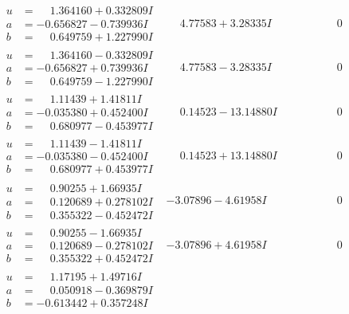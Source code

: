 \documentclass[1p]{elsarticle_modified}
\theoremstyle{definition}
\begin{document}
$$\begin{array}{c|c|c}
\begin{aligned}
u &= \phantom{-}1.364160 + 0.332809 I \\
a &= -0.656827 - 0.739936 I \\
b &= \phantom{-}0.649759 + 1.227990 I\end{aligned}
 & \phantom{-}4.77583 + 3.28335 I & \phantom{-0.000000 } 0 \\ \hline\begin{aligned}
u &= \phantom{-}1.364160 - 0.332809 I \\
a &= -0.656827 + 0.739936 I \\
b &= \phantom{-}0.649759 - 1.227990 I\end{aligned}
 & \phantom{-}4.77583 - 3.28335 I & \phantom{-0.000000 } 0 \\ \hline\begin{aligned}
u &= \phantom{-}1.11439 + 1.41811 I \\
a &= -0.035380 + 0.452400 I \\
b &= \phantom{-}0.680977 - 0.453977 I\end{aligned}
 & \phantom{-}0.14523 - 13.14880 I & \phantom{-0.000000 } 0 \\ \hline\begin{aligned}
u &= \phantom{-}1.11439 - 1.41811 I \\
a &= -0.035380 - 0.452400 I \\
b &= \phantom{-}0.680977 + 0.453977 I\end{aligned}
 & \phantom{-}0.14523 + 13.14880 I & \phantom{-0.000000 } 0 \\ \hline\begin{aligned}
u &= \phantom{-}0.90255 + 1.66935 I \\
a &= \phantom{-}0.120689 + 0.278102 I \\
b &= \phantom{-}0.355322 - 0.452472 I\end{aligned}
 & -3.07896 - 4.61958 I & \phantom{-0.000000 } 0 \\ \hline\begin{aligned}
u &= \phantom{-}0.90255 - 1.66935 I \\
a &= \phantom{-}0.120689 - 0.278102 I \\
b &= \phantom{-}0.355322 + 0.452472 I\end{aligned}
 & -3.07896 + 4.61958 I & \phantom{-0.000000 } 0 \\ \hline\begin{aligned}
u &= \phantom{-}1.17195 + 1.49716 I \\
a &= \phantom{-}0.050918 - 0.369879 I \\
b &= -0.613442 + 0.357248 I\end{aligned}

\end{array}$$
\end{document}
